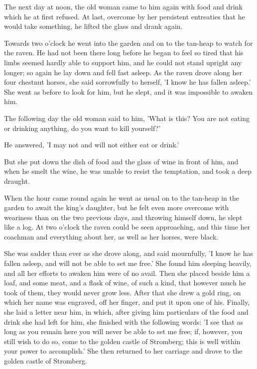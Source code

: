 \documentclass[12pt]{book}
\begin{document}
The next day at noon, the old woman came to him again with food and
drink which he at first refused. At last, overcome by her persistent
entreaties that he would take something, he lifted the glass and drank
again.

Towards two o'clock he went into the garden and on to the tan-heap to
watch for the raven. He had not been there long before he began to
feel so tired that his limbs seemed hardly able to support him, and he
could not stand upright any longer; so again he lay down and fell fast
asleep. As the raven drove along her four chestnut horses, she said
sorrowfully to herself, 'I know he has fallen asleep.' She went as
before to look for him, but he slept, and it was impossible to awaken
him.

The following day the old woman said to him, 'What is this? You are
not eating or drinking anything, do you want to kill yourself?'

He answered, 'I may not and will not either eat or drink.'

But she put down the dish of food and the glass of wine in front of
him, and when he smelt the wine, he was unable to resist the
temptation, and took a deep draught.

When the hour came round again he went as usual on to the tan-heap in
the garden to await the king's daughter, but he felt even more
overcome with weariness than on the two previous days, and throwing
himself down, he slept like a log. At two o'clock the raven could be
seen approaching, and this time her coachman and everything about her,
as well as her horses, were black.

She was sadder than ever as she drove along, and said mournfully, 'I
know he has fallen asleep, and will not be able to set me free.' She
found him sleeping heavily, and all her efforts to awaken him were of
no avail. Then she placed beside him a loaf, and some meat, and a
flask of wine, of such a kind, that however much he took of them, they
would never grow less. After that she drew a gold ring, on which her
name was engraved, off her finger, and put it upon one of his.
Finally, she laid a letter near him, in which, after giving him
particulars of the food and drink she had left for him, she finished
with the following words: 'I see that as long as you remain here you
will never be able to set me free; if, however, you still wish to do
so, come to the golden castle of Stromberg; this is well within your
power to accomplish.' She then returned to her carriage and drove to
the golden castle of Stromberg.
\end{document}
